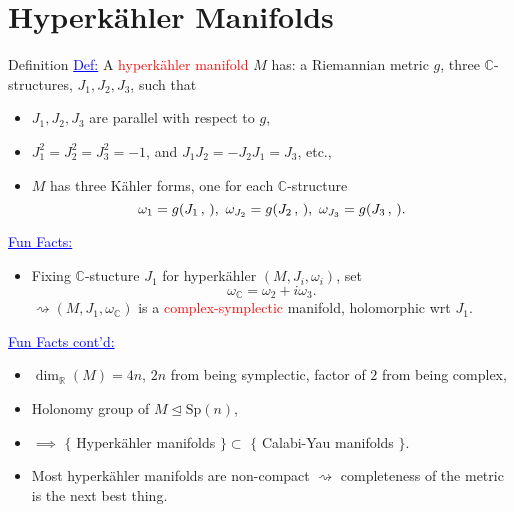 \section{Hyperk\"ahler Manifolds}

\begin{frame}{Definition}
    \textcolor{blue}{\underline{Def:}} A \textcolor{red}{hyperk\"ahler manifold} $M$ has: a Riemannian metric $g$, three $\mathbb{C}$-structures, $J_{1}, J_{2}, J_{3}$, such that
        \begin{itemize}
            \item $J_{1}, J_{2}, J_{3}$ are parallel with respect to $g$,
            \item $J_{1}^{2} = J_{2}^{2} = J_{3}^{2} = -1$, and $J_{1}J_{2} = -J_{2}J_{1} = J_{3}$, etc.,
            \item $M$ has three K\"ahler forms, one for each $\mathbb{C}$-structure
            \[
                \omega_{1} = g(J_{1}\,,\,),\ \omega_{J_{2}} = g(J_{2}\,,\,),\ \omega_{J_{3}} = g(J_{3}\,,\,).    
            \]
        \end{itemize}        
    \textcolor{blue}{\underline{Fun Facts:}}
    \begin{itemize}
        \item Fixing $\mathbb{C}$-stucture $J_{1}$ for hyperk\"ahler $(M, J_{i}, \omega_{i})$, set
        \[
            \omega_{\mathbb{C}} = \omega_{2} + i\omega_{3}.    
        \]
        $\rightsquigarrow (M,J_{1}, \omega_{\mathbb{C}})$ is a \textcolor{red}{complex-symplectic} manifold, holomorphic wrt $J_{1}$.
    \end{itemize}
\end{frame}

\begin{frame}{}
    \textcolor{blue}{\underline{Fun Facts cont'd:}} 
        \begin{itemize}
            \item $\dim_{\mathbb{R}}(M) = 4n$, $2n$ from being symplectic, factor of $2$ from being complex,
            \item Holonomy group of $M \unlhd \text{Sp}(n)$,
            \item $\implies$ $\{$ Hyperk\"ahler manifolds $\} \subset$ $\{$ Calabi-Yau manifolds $\}$.
            \item Most hyperk\"ahler manifolds are non-compact $\rightsquigarrow$ completeness of the metric is the next best thing.
        \end{itemize}
\end{frame}

